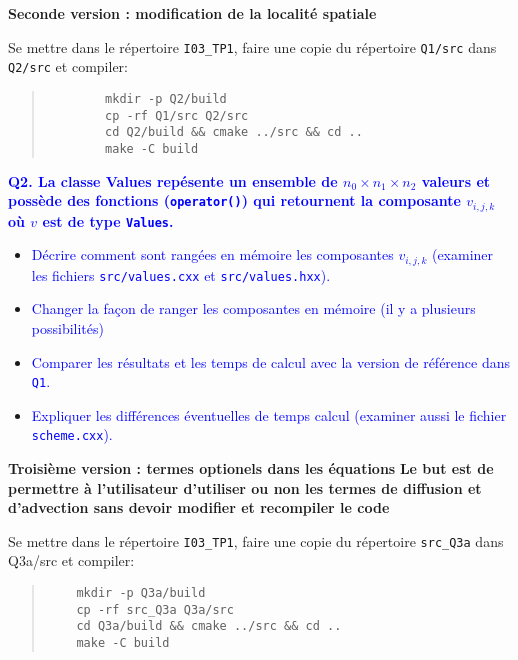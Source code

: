 \documentclass{beamer}
\begin{document}
\begin{frame}[fragile]
    
	\vfill
	{\bf Seconde version : modification de la localit\'e spatiale}
	\vfill
	
	Se mettre dans le r\'epertoire {\tt I03\_TP1}, faire une copie du r\'epertoire {\tt Q1/src} dans {\tt Q2/src} et compiler:
	
	\begin{quote}
		\begin{verbatim}
		mkdir -p Q2/build
		cp -rf Q1/src Q2/src
		cd Q2/build && cmake ../src && cd ..
		make -C build
		\end{verbatim}
	\end{quote}

\end{frame}

\begin{frame}[fragile]
	\vfill
	\textcolor{blue}{\bf Q2. La classe {Values} rep\'esente un ensemble de $n_0 \times n_1 \times n_2$ valeurs et poss\`ede des fonctions ({\tt operator()}) qui retournent la composante $v_{i,j,k}$ o\`u $v$ est de type {\tt Values}.}
	
	\vfill
	\begin{itemize}
		\item \textcolor{blue}{D\'ecrire comment sont rang\'ees en m\'emoire les composantes $v_{i,j,k}$
		(examiner les fichiers {\tt src/values.cxx} et {\tt src/values.hxx}).}
	\vfill
		\item \textcolor{blue}{Changer la fa\c{c}on de ranger les composantes en m\'emoire (il y a plusieurs possibilit\'es)}
	\vfill
		\item \textcolor{blue}{Comparer les r\'esultats et les temps de calcul avec la version de r\'ef\'erence dans {\tt Q1}.}
	\vfill
		\item \textcolor{blue}{Expliquer les diff\'erences \'eventuelles de temps calcul (examiner aussi le fichier {\tt scheme.cxx}).}
	\end{itemize}
	\vfill
	 
\end{frame}

\begin{frame}[fragile]
\vfill
	{\bf Troisième version : termes optionels dans les \'equations}
\vfill
{\bf Le but est de permettre \`a l'utilisateur d'utiliser ou non les termes de diffusion et d'advection sans devoir modifier et recompiler le code}

\vfill

Se mettre dans le r\'epertoire {\tt I03\_TP1}, faire une copie du r\'epertoire {\tt src\_Q3a} dans {Q3a/src} et compiler:
\begin{quote}
	\begin{verbatim}
	mkdir -p Q3a/build
	cp -rf src_Q3a Q3a/src
	cd Q3a/build && cmake ../src && cd ..
	make -C build
	\end{verbatim}
\end{quote}

\end{frame}
\end{document}
